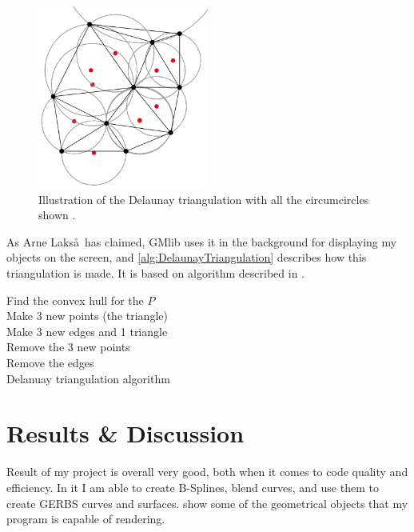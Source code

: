 \documentclass[a4paper,12pt]{extarticle}
\begin{document}
\begin{figure}[H]
  \centering
  \includegraphics[width=0.5\textwidth]{Circumcircle.png}
  \caption{Illustration of the Delaunay triangulation with all the circumcircles shown \citep{NuEs:2016}.}
  \label{fig:Circumcircle}
\end{figure}

As Arne Laks\aa\, has claimed, GMlib uses it in the background for displaying my objects on the screen, and \cref{alg:DelaunayTriangulation} describes how this triangulation is made. It is based on algorithm described in \citep[Chapter 9.3]{Schwarzkopf1997}.

\begin{algorithm}
  \SetAlgoLined
  Find the convex hull for the $P$\\
  Make 3 new points (the triangle)\\
  Make 3 new edges and 1 triangle\\
  Remove the 3 new points\\
  Remove the edges\\
  \caption{Delanuay triangulation algorithm}
  \label{alg:DelaunayTriangulation}
\end{algorithm}
 
\section{Results \& Discussion} \label{sec:Results}
Result of my project is overall very good, both when it comes to code quality and efficiency. In it I am able to create B-Splines, blend curves, and use them to create GERBS curves and surfaces.  show some of the geometrical objects that my program is capable of rendering.
\end{document}
